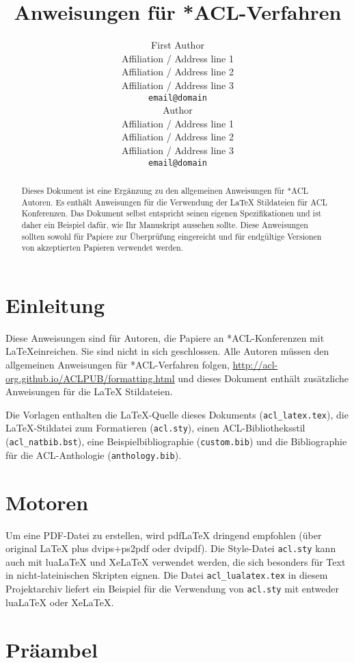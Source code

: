 \documentclass[11pt]{article}
\title{Anweisungen für *ACL-Verfahren}
\author{First Author \\
  Affiliation / Address line 1 \\
  Affiliation / Address line 2 \\
  Affiliation / Address line 3 \\
  \texttt{email@domain} \\\AndSecond Author \\
  Affiliation / Address line 1 \\
  Affiliation / Address line 2 \\
  Affiliation / Address line 3 \\
  \texttt{email@domain} \\}
\begin{document}
\maketitle\begin{abstract}
Dieses Dokument ist eine Ergänzung zu den allgemeinen Anweisungen für *ACL Autoren. Es enthält Anweisungen für die Verwendung der \LaTeX{} Stildateien für ACL Konferenzen. Das Dokument selbst entspricht seinen eigenen Spezifikationen und ist daher ein Beispiel dafür, wie Ihr Manuskript aussehen sollte. Diese Anweisungen sollten sowohl für Papiere zur Überprüfung eingereicht und für endgültige Versionen von akzeptierten Papieren verwendet werden.
\end{abstract}

\section{Einleitung}

Diese Anweisungen sind für Autoren, die Papiere an *ACL-Konferenzen mit \LaTeX einreichen. Sie sind nicht in sich geschlossen. Alle Autoren müssen den allgemeinen Anweisungen für *ACL-Verfahren folgen, \url{http://acl-org.github.io/ACLPUB/formatting.html} und dieses Dokument enthält zusätzliche Anweisungen für die \LaTeX{} Stildateien.

Die Vorlagen enthalten die \LaTeX{}-Quelle dieses Dokuments (\texttt{acl\_latex.tex}), die \LaTeX{}-Stildatei zum Formatieren (\texttt{acl.sty}), einen ACL-Bibliotheksstil (\texttt{acl\_natbib.bst}), eine Beispielbibliographie (\texttt{custom.bib}) und die Bibliographie für die ACL-Anthologie (\texttt{anthology.bib}).

\section{Motoren}

Um eine PDF-Datei zu erstellen, wird pdf\LaTeX{} dringend empfohlen (über original \LaTeX{} plus dvips+ps2pdf oder dvipdf). Die Style-Datei \texttt{acl.sty} kann auch mit lua\LaTeX{} und Xe\LaTeX{} verwendet werden, die sich besonders für Text in nicht-lateinischen Skripten eignen. Die Datei \texttt{acl\_lualatex.tex} in diesem Projektarchiv liefert ein Beispiel für die Verwendung von \texttt{acl.sty} mit entweder lua\LaTeX{} oder Xe\LaTeX{}.

\section{Präambel}
\end{document}
